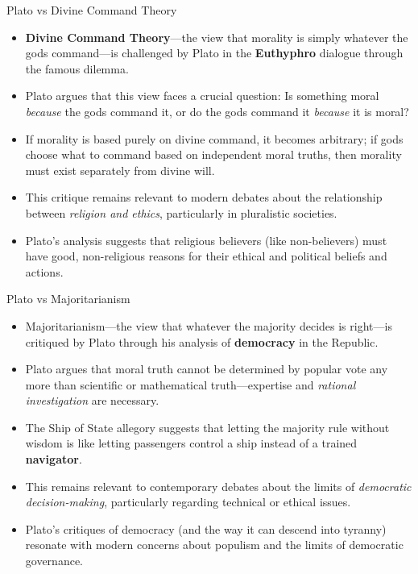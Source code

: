 \documentclass[aspectratio=169]{beamer}
\begin{document}
\begin{frame}{Plato vs Divine Command Theory}
    \begin{itemize}
    \item \textbf{Divine Command Theory}—the view that morality is simply whatever the gods command—is challenged by Plato in the \textbf{Euthyphro} dialogue through the famous dilemma.
    \item Plato argues that this view faces a crucial question: Is something moral \emph{because} the gods command it, or do the gods command it \emph{because} it is moral?
    \item If morality is based purely on divine command, it becomes arbitrary; if gods choose what to command based on independent moral truths, then morality must exist separately from divine will.
    \item This critique remains relevant to modern debates about the relationship between \emph{religion and ethics}, particularly in pluralistic societies.
    \item Plato's analysis suggests that religious believers (like non-believers) must have good, non-religious reasons for their ethical and political beliefs and actions.
    \end{itemize}
    \end{frame}
    
    \begin{frame}{Plato vs Majoritarianism}
    \begin{itemize}
    \item Majoritarianism—the view that whatever the majority decides is right—is critiqued by Plato through his analysis of \textbf{democracy} in the Republic.
    \item Plato argues that moral truth cannot be determined by popular vote any more than scientific or mathematical truth—expertise and \emph{rational investigation} are necessary.
    \item The Ship of State allegory suggests that letting the majority rule without wisdom is like letting passengers control a ship instead of a trained \textbf{navigator}.
    \item This remains relevant to contemporary debates about the limits of \emph{democratic decision-making}, particularly regarding technical or ethical issues.
    \item Plato's critiques of democracy (and the way it can descend into tyranny) resonate with modern concerns about populism and the limits of democratic governance.
    \end{itemize}
    \end{frame}
\end{document}
